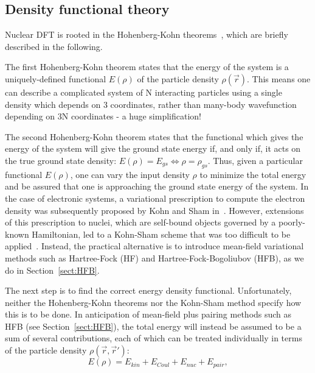 \subsection{Density functional theory}\label{sect:DFT}
Nuclear DFT is rooted in the Hohenberg-Kohn theorems~\cite{Hohenberg1964}, which are briefly described in the following.

The first Hohenberg-Kohn theorem states that the energy of the system is a uniquely-defined functional $E(\rho)$ of the particle density $\rho(\vec{r})$. This means one can describe a complicated system of N interacting particles using a single density which depends on 3 coordinates, rather than many-body wavefunction depending on 3N coordinates - a huge simplification!

The second Hohenberg-Kohn theorem states that the functional which gives the energy of the system will give the ground state energy if, and only if, it acts on the true ground state density: $E(\rho)=E_{gs} \iff \rho = \rho_{gs}$. Thus, given a particular functional $E(\rho)$, one can vary the input density $\rho$ to minimize the total energy and be assured that one is approaching the ground state energy of the system. In the case of electronic systems, a variational prescription to compute the electron density was subsequently proposed by Kohn and Sham in~\cite{Kohn1965}. However, extensions of this prescription to nuclei, which are self-bound objects governed by a poorly-known Hamiltonian, led to a Kohn-Sham scheme that was too difficult to be applied~\cite{engel2007,barnea2007,messud2009}. Instead, the practical alternative is to introduce mean-field variational methods such as Hartree-Fock (HF) and Hartree-Fock-Bogoliubov (HFB), as we do in Section~\ref{sect:HFB}.

The next step is to find the correct energy density functional. Unfortunately, neither the Hohenberg-Kohn theorems nor the Kohn-Sham method specify how this is to be done. In anticipation of mean-field plus pairing methods such as HFB (see Section~\ref{sect:HFB}), the total energy will instead be assumed to be a sum of several contributions, each of which can be treated individually in terms of the particle density $\rho(\vec{r},\vec{r}')$:
\begin{equation}\label{eq:EDFterms}
E(\rho) = E_{kin} + E_{Coul} + E_{nuc} + E_{pair},
\end{equation}

